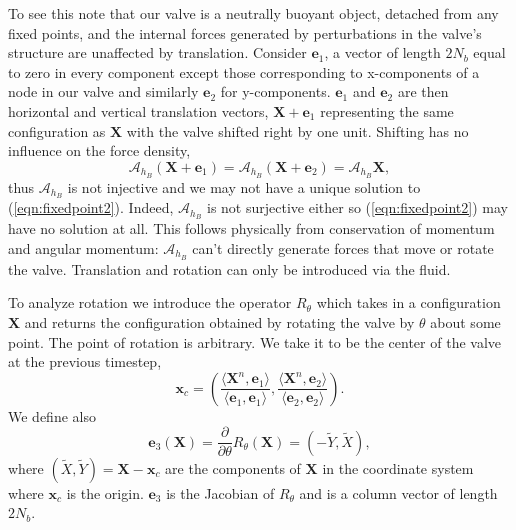\documentclass[preprint,12pt]{elsarticle}
\begin{document}
To see this note that our valve is a neutrally buoyant object, detached from any fixed points, and the internal forces generated by perturbations in the valve's structure are unaffected by translation. Consider $\mathbf{e}_1$, a vector of length $2N_b$ equal to zero in every component except those corresponding to x-components of a node in our valve and similarly $\mathbf{e}_2$ for y-components. $\mathbf{e}_1$ and $\mathbf{e}_2$ are then horizontal and vertical translation vectors, $\mathbf{X}+\mathbf{e}_1$ representing the same configuration as $\mathbf{X}$ with the valve shifted right by one unit. Shifting has no influence on the force density,
\begin{equation}
\mathcal{A}_{h_B}(\mathbf{X}+\mathbf{e}_1) = \mathcal{A}_{h_B}(\mathbf{X}+\mathbf{e}_2) = \mathcal{A}_{h_B}\mathbf{X},
\end{equation}
thus $\mathcal{A}_{h_B}$ is not injective and we may not have a unique solution to (\ref{eqn:fixedpoint2}). Indeed, $\mathcal{A}_{h_B}$ is not surjective either so (\ref{eqn:fixedpoint2}) may have no solution at all. This follows physically from conservation of momentum and angular momentum: $\mathcal{A}_{h_B}$ can't directly generate forces that move or rotate the valve. Translation and rotation can only be introduced via the fluid. 

To analyze rotation we introduce the operator $R_{\theta}$ which takes in a configuration $\mathbf{X}$ and returns the configuration obtained by rotating the valve by $\theta$ about some point. The point of rotation is arbitrary. We take it to be the center of the valve at the previous timestep,
\begin{equation}
\mathbf{x}_c = 
\left(\frac{\langle \mathbf{X}^n, \mathbf{e}_1\rangle}{\langle \mathbf{e}_1, \mathbf{e}_1\rangle}, 
\frac{\langle \mathbf{X}^n, \mathbf{e}_2\rangle}{\langle \mathbf{e}_2, \mathbf{e}_2\rangle}\right).
\label{eqn:Center}
\end{equation}
We define also
\begin{equation}
\mathbf{e}_3(\mathbf{X}) = \frac{\partial}{\partial \theta}R_\theta(\mathbf{X}) = (-\tilde{Y},\tilde{X}),
\label{eqn:e3}
\end{equation}
where $(\tilde{X},\tilde{Y})=\mathbf{X}-\mathbf{x}_c$ are the components of $\mathbf{X}$ in the coordinate system where $\mathbf{x}_c$ is the origin. $\mathbf{e}_3$ is the Jacobian of $R_\theta$ and is a column vector of length $2N_b$.
\end{document}
